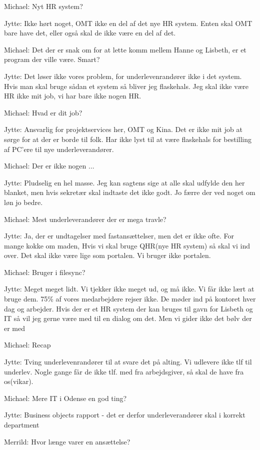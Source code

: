 Michael:
Nyt HR system?

Jytte:
Ikke hørt noget, OMT ikke en del af det nye HR system.
Enten skal OMT bare have det, eller også skal de ikke være en del af det.

Michael:
Det der er snak om for at lette komm mellem Hanne og Lisbeth,
er et program der ville være. Smart?

Jytte:
Det løser ikke vores problem, for underlevenrandører ikke i det system.
Hvis man skal bruge sådan et system så bliver jeg flaskehals.
Jeg skal ikke være HR ikke mit job, vi har bare ikke nogen HR. 

Michael:
Hvad er dit job?

Jytte:
Ansvarlig for projektservices her, OMT og Kina.
Det er ikke mit job at sørge for at der er borde til folk.
Har ikke lyst til at være flaskehals for bestilling af PC’ere til nye underleverandører. 

Michael:
Der er ikke nogen ...

Jytte:
Pludselig en hel masse. Jeg kan sagtens sige at alle skal udfylde den her blanket,
men hvis sekretær skal indtaste det ikke godt. Jo færre der ved noget om løn jo bedre.

Michael:
Mest underleverandører der er mega travle?

Jytte:
Ja, der er undtagelser med fastansættelser, men det er ikke ofte.
For mange kokke om maden, 
Hvis vi skal bruge QHR(nye HR system) så skal vi ind over.
Det skal ikke være lige som portalen. Vi bruger ikke portalen.
 
Michael:
Bruger i filesync?

Jytte:
Meget meget lidt. Vi tjekker ikke meget ud, og må ikke.
Vi får ikke lært at bruge dem.
75\% af vores medarbejdere rejser ikke. De møder ind på kontoret hver dag og arbejder.
Hvis der er et HR system der kan bruges til gavn for Lisbeth og IT
så vil jeg gerne være med til en dialog om det. 
Men vi gider ikke det bølv der er med 

Michael:
Recap

Jytte:
Tving underlevenrandører til at svare det på alting.
Vi udlevere ikke tlf til underlev.
Nogle gange får de ikke tlf. med fra arbejdsgiver, så skal de have fra os(vikar).

Michael:
Mere IT i Odense en god ting?

Jytte:
Business objects rapport - det er derfor underleverandører skal i korrekt department

Merrild:
Hvor længe varer en ansættelse?

